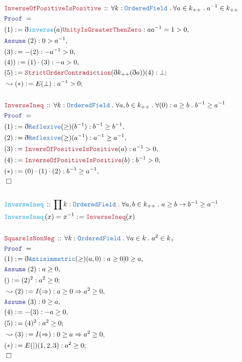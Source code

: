 \documentclass[12pt]{scrartcl}
\newcommand{\TYPE}[1]{\textcolor{NavyBlue}{\mathtt{#1}}}
\newcommand{\FUNC}[1]{\textcolor{Cerulean}{\mathtt{#1}}}
\newcommand{\LOGIC}[1]{\textcolor{Blue}{\mathtt{#1}}}
\newcommand{\THM}[1]{\textcolor{Maroon}{\mathtt{#1}}}
\renewcommand{\.}{\; . \;}
\newcommand{\de}{: \kern 0.1pc =}
\newcommand{\Act}[1]{\left( #1 \right)}
\newcommand{\Theorem}[2]{& \THM{#1} \, :: \, #2 \\ & \Proof = \\ }
\newcommand{\DeclareFunc}[2]{& \FUNC{#1} \, :: \, #2 \\}
\newcommand{\DefineNamedFunc}[4]{&  \FUNC{#1}\Act{#2} = #3 \de #4 \\}
\newcommand{\Page}[1]{ \begin{align*} #1 \end{align*}   }
\newcommand{ \bd }{ \ByDef }
\newcommand{\Say}[3]{& #1 \de #2 : #3, \\}
\newcommand{\Conclude}[3]{& #1 \de #2 : #3; \\}
\newcommand{\Derive}[3]{& \leadsto #1 \de #2 : #3, \\}
\newcommand{\DeriveConclude}[3]{& \leadsto #1 \de #2 : #3 ; \\}
\newcommand{\A}{\LOGIC{Assume} \;}
\newcommand{\Assume}[2]{& \A #1 : #2, \\}
\newcommand{\QED}{\; \square}
\newcommand{\EndProof}{& \QED \\}
\newcommand{\ByDef}{\eth}
\newcommand{\Proof}{\LOGIC{Proof} \; }
\newcommand{\OF}{\TYPE{OrderedField}}
\begin{document}
\Page{
\Theorem{InverseOfPositiveIsPositive}{\forall k : \OF \. \forall a \in k_{++} \. a^{-1} \in k_{++}}
\Say{(1) }{ \bd\FUNC{inverse}(a)\THM{UnityIsGreaterThenZero}}{aa^{-1} = 1 > 0}
\Assume{(2)}{ 0 > a^{-1} }
\Say{(3)}{ -(2)}{-a^{-1} > 0}
\Say{(4))}{ (1)\cdot(3) }{ -a > 0  }
\Conclude{(5)}{ \THM{StrictOrderContradiction}(\bd k_{++}(\bd a))(4)}{ \bot }
\DeriveConclude{(*)}{E(\bot)}{ a^{-1} > 0}
\\
\Theorem{InverseIneq}{\forall k : \OF \. \forall a,b \in k_{++} \. \forall (0) :  a \ge b  \.  b^{-1} \ge a^{-1}}
\Say{(1)}{\bd \TYPE{Reflexive}(\ge)(b^{-1})}{b^{-1} \ge b^{-1}}
\Say{(2)}{\bd \TYPE{Reflexive}(\ge)(a^{-1})}{a^{-1} \ge a^{-1}}
\Say{(3)}{ \THM{InversOfPositiveIsPositive}( a )   }{a^{-1} > 0}
\Say{(4)}{ \THM{InverseOfPositiveIsPositive}(b)}{b^{-1} > 0}  
\Say{(*)}{ (0)\cdot(1)\cdot(2) }{ b^{-1} \ge a^{-1}}
\EndProof
\\
\DeclareFunc{InverseIneq}{\prod k : \OF \. \forall a,b \in k_{++} \. a \ge b \to b^{-1} \ge a^{-1}}
\DefineNamedFunc{InverseIneq}{x}{x^{-1}}{\THM{InverseIneq}(x)}
\\
\Theorem{SquareIsNonNeg}{\forall k : \OF \. \forall a \in k \. a^2 \in k_{+}}
\Say{ (1)  }{\bd \TYPE{Antisimmetric}(\ge)(a,0)}{ a \ge 0 | 0 \ge a}
\Assume{(2)}{ a \ge 0 }
\Conclude{()}{ (2)^2 }{a^2 \ge 0}
\Derive{(2)}{I(\Rightarrow)}{a \ge 0 \Rightarrow a^2 \ge 0}
\Assume{(3)}{ 0 \ge a}
\Say{(4)}{-(3)}{ -a \ge 0 }
\Conclude{(5)}{ (4)^2  }{ a^2 \ge 0    }
\Derive{(3)}{I(\Rightarrow)}{ 0 \ge a \Rightarrow a^2 \ge 0}
\Conclude{(*)}{E(|)(1,2,3)}{ a^2 \ge 0  }
\EndProof
}
\end{document}
